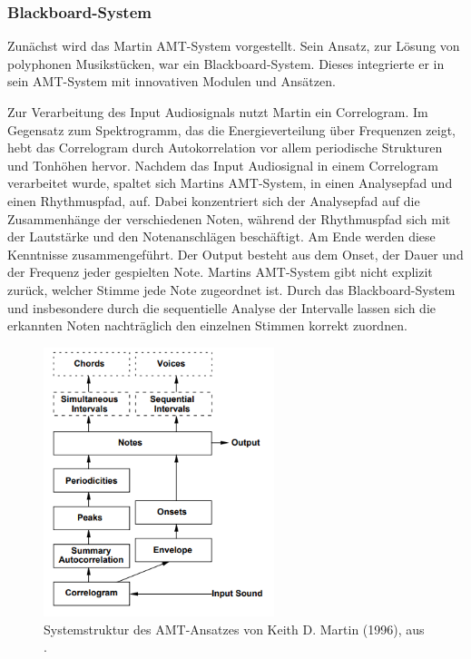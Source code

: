 \subsubsection{Blackboard-System}
Zunächst wird das Martin AMT-System \cite{Martin1996} vorgestellt.
Sein Ansatz, zur Lösung von polyphonen Musikstücken, war ein Blackboard-System.
Dieses integrierte er in sein AMT-System mit innovativen Modulen und Ansätzen.

Zur Verarbeitung des Input Audiosignals nutzt Martin ein Correlogram.
Im Gegensatz zum Spektrogramm, das die Energieverteilung über Frequenzen zeigt,
hebt das Correlogram durch Autokorrelation vor allem periodische Strukturen und Tonhöhen hervor.
Nachdem das Input Audiosignal in einem Correlogram verarbeitet wurde,
spaltet sich Martins AMT-System, in einen Analysepfad und einen Rhythmuspfad, auf.
Dabei konzentriert sich der Analysepfad auf die Zusammenhänge der verschiedenen Noten,
während der Rhythmuspfad sich mit der Lautstärke und den Notenanschlägen beschäftigt.
Am Ende werden diese Kenntnisse zusammengeführt.
Der Output besteht aus dem Onset, der Dauer und der Frequenz jeder gespielten Note.
Martins AMT-System gibt nicht explizit zurück, welcher Stimme jede Note zugeordnet ist.
Durch das Blackboard-System und insbesondere durch die sequentielle Analyse der Intervalle
lassen sich die erkannten Noten nachträglich den einzelnen Stimmen korrekt zuordnen.

\begin{figure}[H]
    \centering
    \includegraphics[width=0.6\textwidth]{Graphics/Martin1996Structure}
    \caption[Systemstruktur nach Martin]{Systemstruktur des AMT-Ansatzes von Keith D. Martin (1996), aus  \cite{Martin1996}.}
    \label{fig:martin-structure}
\end{figure}

